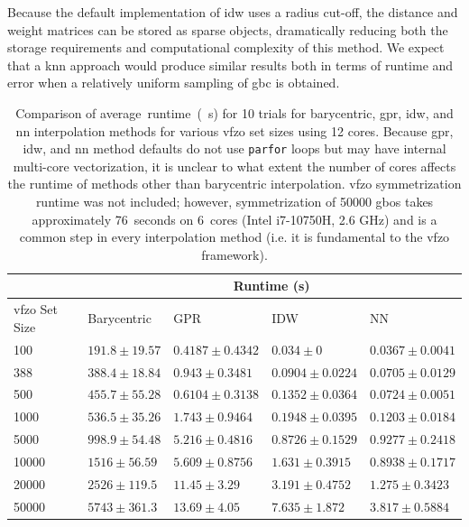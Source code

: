 \documentclass[final,twocolumn,12pt]{elsarticle}
\newcommand{\matlab}[1]{\mbox{\lstinline[style=Matlab-editor]{#1}}}
\newcommand{\symtime}{76}
\begin{document}
Because the default implementation of \gls{idw} uses a radius cut-off, the distance and weight matrices can be stored as sparse objects, dramatically reducing both the storage requirements and computational complexity of this method. We expect that a \gls{knn} approach would produce similar results both in terms of runtime and error when a relatively uniform sampling of \gls{gbc} is obtained.

\begin{table}
\centering
\caption{Comparison of average~runtime~(\SI{}{\second}) for \num{10} trials for barycentric, \gls{gpr}, \gls{idw}, and \gls{nn} interpolation methods for various \gls{vfzo} set sizes using 12 cores. Because \gls{gpr}, \gls{idw}, and \gls{nn} method defaults do not use \matlab{parfor} loops but may have internal multi-core vectorization, it is unclear to what extent the number of cores affects the runtime of methods other than barycentric interpolation. \Gls{vfzo} symmetrization runtime was not included; however, symmetrization of \num{50000} \glspl{gbo} takes approximately \SI{\symtime}{seconds} on \SI{6}{cores} (Intel i7-10750H, 2.6 GHz) and is a common step in every interpolation method (i.e. it is fundamental to the \gls{vfzo} framework).}
\label{tab:runtime}
\begin{tabular}{lllll}
\cline{2-5}
                    & \multicolumn{4}{c}{Runtime (s)}                                                     \\ \hline
\gls{vfzo} Set Size & Barycentric       & GPR                 & IDW                 & NN                  \\ \hline
\num{100}           & $191.8 \pm 19.57$ & $0.4187 \pm 0.4342$ & $0.034 \pm 0$       & $0.0367 \pm 0.0041$ \\
\num{388}           & $388.4 \pm 18.84$ & $0.943 \pm 0.3481$  & $0.0904 \pm 0.0224$ & $0.0705 \pm 0.0129$ \\
\num{500}           & $455.7 \pm 55.28$ & $0.6104 \pm 0.3138$ & $0.1352 \pm 0.0364$ & $0.0724 \pm 0.0051$ \\
\num{1000}          & $536.5 \pm 35.26$ & $1.743 \pm 0.9464$  & $0.1948 \pm 0.0395$ & $0.1203 \pm 0.0184$ \\
\num{5000}          & $998.9 \pm 54.48$ & $5.216 \pm 0.4816$  & $0.8726 \pm 0.1529$ & $0.9277 \pm 0.2418$ \\
\num{10000}         & $1516 \pm 56.59$  & $5.609 \pm 0.8756$  & $1.631 \pm 0.3915$  & $0.8938 \pm 0.1717$ \\
\num{20000}         & $2526 \pm 119.5$  & $11.45 \pm 3.29$    & $3.191 \pm 0.4752$  & $1.275 \pm 0.3423$  \\
\num{50000}         & $5743 \pm 361.3$  & $13.69 \pm 4.05$    & $7.635 \pm 1.872$   & $3.817 \pm 0.5884$  \\ \hline
\end{tabular}
\end{table}
\end{document}
